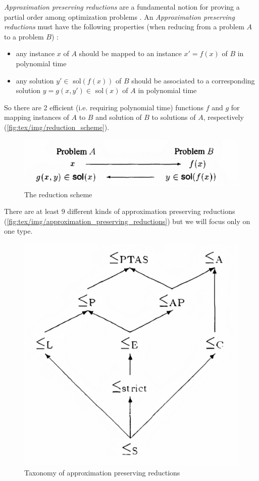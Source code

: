 \emph{Approximation preserving reductions} are a fundamental notion for proving
a partial order among optimization problems \cite{Ausiello2005}. An
\emph{Approximation preserving reductions} must have
the following properties (when reducing from a problem $A$ to a problem $B$)
\cite{DemaineFall2014}:

\begin{itemize}
	\item any instance $x$ of $A$ should be mapped to an instance $x' = f(x)$
	      of $B$ in polynomial time
	\item any solution $y' \in $ sol$(f(x))$ of $B$ should be associated to a corresponding
	      solution $y = g(x, y') \in $ sol$(x)$ of $A$ in polynomial time
\end{itemize}

So there are 2 efficient (i.e. requiring polynomial time) functions $f$ and $g$
for mapping instances of $A$ to $B$ and solution of $B$ to solutions of $A$,
respectively (\autoref{fig:tex/img/reduction_scheme}).

\begin{figure}
	\centering
	\includegraphics[width=0.6\linewidth]{tex/img/reduction_scheme.png}
	\caption[Reduction process]{The reduction scheme \cite{Crescenzi1997ASG}}%
	\label{fig:tex/img/reduction_scheme}
\end{figure}

There are at least 9 different kinds of approximation preserving reductions
\cite{DemaineFall2014}(\autoref{fig:tex/img/approximation_preserving_reductions}) but we will
focus only on one type.

\begin{figure}[b]
	\centering
	\includegraphics[width=0.4\linewidth]{tex/img/approximation_preserving_reductions.png}
	\caption[Taxonomy of approximation preserving reductions]{Taxonomy of approximation preserving reductions \cite{Crescenzi1997ASG}}%
	\label{fig:tex/img/approximation_preserving_reductions}
\end{figure}

